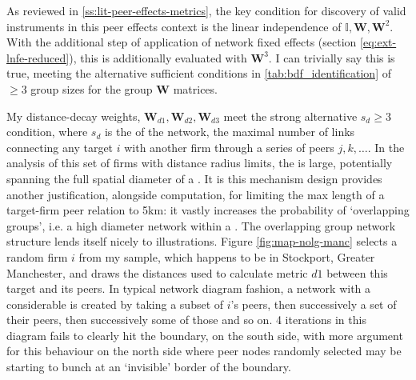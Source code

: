 As reviewed in \ref{ss:lit-peer-effects-metrics}, the key condition
for discovery of valid instruments in this peer effects context is the linear independence of $\mathbb I, \mathbf W, \mathbf W^2$.
With the additional step of application of network fixed effects (section \ref{eq:ext-lnfe-reduced}),
this is additionally evaluated with $\mathbf W^3$.
I can trivially say this is true, meeting the alternative sufficient conditions in \ref{tab:bdf_identification}
of $\geq 3$ group sizes for the group $\mathbf W$ matrices.
\par
My distance-decay weights, $\mathbf W_{d1}, \mathbf W_{d2}, \mathbf W_{d3}$
meet the strong alternative $s_d\geq 3$ condition, where $s_d$ is the  of the network,
the maximal number of links connecting any target $i$ with another firm through a series of peers $j, k, \dots$.
In the analysis of this set of firms with distance radius limits,
the  is large, potentially spanning the full spatial diameter of a .
It is this mechanism design provides another justification, alongside computation,
for limiting the max length of a target-firm peer relation to 5km:
it vastly increases the probability of `overlapping groups', i.e. a high diameter network within a .
The overlapping group network structure lends itself nicely to illustrations.
Figure \ref{fig:map-nolg-manc} selects a random firm $i$ from my sample,
which happens to be in Stockport, Greater Manchester, and draws the distances used to calculate metric $d1$
between this target and its peers. In typical network diagram fashion, a network with a considerable 
is created by taking a subset of $i$'s peers, then successively a set of their peers, then successively some of those
and so on. 4 iterations in this diagram fails to clearly hit the  boundary,
on the south side, with more argument for this behaviour on the north side
where peer nodes randomly selected may be starting to bunch at an `invisible' border of the  boundary.

